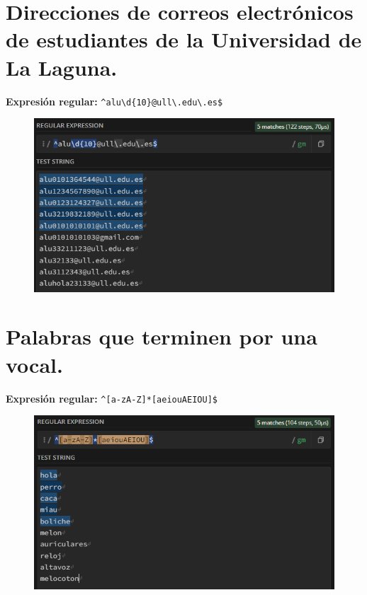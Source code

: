 \documentclass[11pt]{report}
\begin{document}
\section{Direcciones de correos electrónicos de estudiantes de la Universidad de La Laguna.}
\textbf{Expresión regular:} \verb|^alu\d{10}@ull\.edu\.es$|
  \begin{figure}[H]
    \centering
    \includegraphics[scale=0.67]{img/op_extendidos_01.png}
  \end{figure}

\section{Palabras que terminen por una vocal.}
\textbf{Expresión regular:} \verb|^[a-zA-Z]*[aeiouAEIOU]$|
  \begin{figure}[H]
    \centering
    \includegraphics[scale=0.75]{img/op_extendidos_02.png}
  \end{figure}

\newpage
\end{document}
